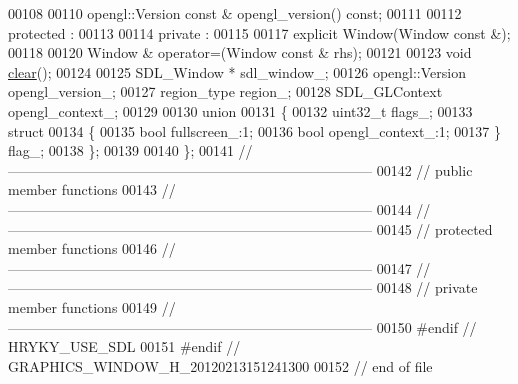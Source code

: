 \begin{DoxyCode}
00108 
00110     opengl::Version \textcolor{keyword}{const} & opengl\_version() \textcolor{keyword}{const};
00111 
00112 \textcolor{keyword}{protected} :
00113 
00114 \textcolor{keyword}{private} :
00115 
00117     \textcolor{keyword}{explicit} Window(Window \textcolor{keyword}{const} &);
00118 
00120     Window & operator=(Window \textcolor{keyword}{const} & rhs);
00121 
00123     \textcolor{keywordtype}{void} \hyperlink{namespacehryky_aa201297ea9530da954a7230be71cc19d}{clear}();
00124 
00125     SDL\_Window *        sdl\_window\_;
00126     opengl::Version     opengl\_version\_;
00127     region\_type         region\_;
00128     SDL\_GLContext       opengl\_context\_;
00129 
00130     \textcolor{keyword}{union}
00131     \{
00132         uint32\_t    flags\_;
00133         \textcolor{keyword}{struct}
00134         \{
00135             \textcolor{keywordtype}{bool}    fullscreen\_:1;
00136             \textcolor{keywordtype}{bool}    opengl\_context\_:1;
00137         \} flag\_;
00138     \};
00139 
00140 \};
00141 \textcolor{comment}{//
      ------------------------------------------------------------------------------}
00142 \textcolor{comment}{// public member functions}
00143 \textcolor{comment}{//
      ------------------------------------------------------------------------------}
00144 \textcolor{comment}{//
      ------------------------------------------------------------------------------}
00145 \textcolor{comment}{// protected member functions}
00146 \textcolor{comment}{//
      ------------------------------------------------------------------------------}
00147 \textcolor{comment}{//
      ------------------------------------------------------------------------------}
00148 \textcolor{comment}{// private member functions}
00149 \textcolor{comment}{//
      ------------------------------------------------------------------------------}
00150 \textcolor{preprocessor}{#endif // HRYKY\_USE\_SDL}
00151 \textcolor{preprocessor}{}\textcolor{preprocessor}{#endif // GRAPHICS\_WINDOW\_H\_20120213151241300}
00152 \textcolor{preprocessor}{}\textcolor{comment}{// end of file}
\end{DoxyCode}
